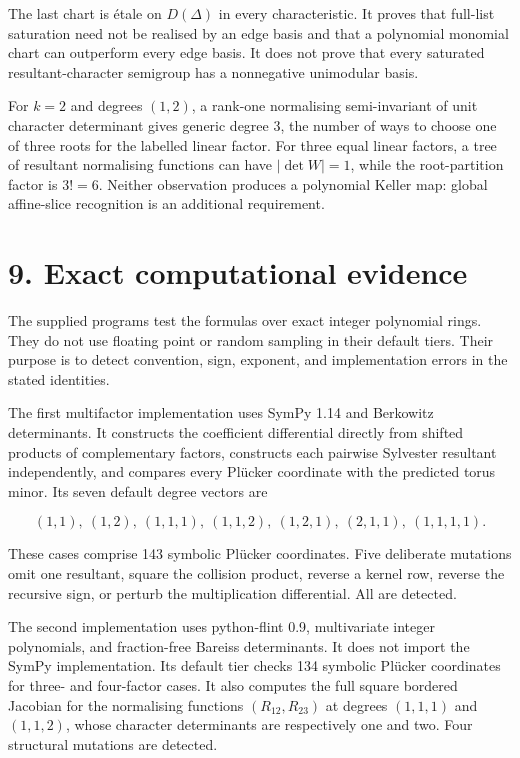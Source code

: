 \documentclass[
  11pt,
  a4paper,
]{article}
\begin{document}
The last chart is étale on \(D(\Delta)\) in every characteristic. It
proves that full-list saturation need not be realised by an edge basis
and that a polynomial monomial chart can outperform every edge basis. It
does not prove that every saturated resultant-character semigroup has a
nonnegative unimodular basis.

For \(k=2\) and degrees \((1,2)\), a rank-one normalising semi-invariant
of unit character determinant gives generic degree \(3\), the number of
ways to choose one of three roots for the labelled linear factor. For
three equal linear factors, a tree of resultant normalising functions
can have \(|\det W|=1\), while the root-partition factor is \(3!=6\).
Neither observation produces a polynomial Keller map: global
affine-slice recognition is an additional requirement.

\section{9. Exact computational
evidence}\label{exact-computational-evidence}

The supplied programs test the formulas over exact integer polynomial
rings. They do not use floating point or random sampling in their
default tiers. Their purpose is to detect convention, sign, exponent,
and implementation errors in the stated identities.

The first multifactor implementation uses SymPy 1.14 and Berkowitz
determinants. It constructs the coefficient differential directly from
shifted products of complementary factors, constructs each pairwise
Sylvester resultant independently, and compares every Plücker coordinate
with the predicted torus minor. Its seven default degree vectors are

\[
 (1,1),\ (1,2),\ (1,1,1),\ (1,1,2),\ (1,2,1),\ (2,1,1),\
 (1,1,1,1).
\]

These cases comprise 143 symbolic Plücker coordinates. Five deliberate
mutations omit one resultant, square the collision product, reverse a
kernel row, reverse the recursive sign, or perturb the multiplication
differential. All are detected.

The second implementation uses python-flint 0.9, multivariate integer
polynomials, and fraction-free Bareiss determinants. It does not import
the SymPy implementation. Its default tier checks 134 symbolic Plücker
coordinates for three- and four-factor cases. It also computes the full
square bordered Jacobian for the normalising functions
\((R_{12},R_{23})\) at degrees \((1,1,1)\) and \((1,1,2)\), whose
character determinants are respectively one and two. Four structural
mutations are detected.
\end{document}

